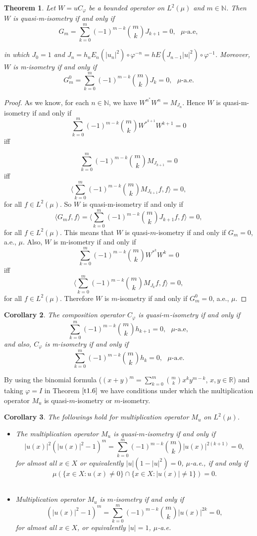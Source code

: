 \documentclass{amsart}
\newtheorem{thm}{Theorem}[section]
\newtheorem{cor}[thm]{Corollary}
\theoremstyle{definition}\newtheorem{defn}[thm]{Definition}
\theoremstyle{remark}
\numberwithin{equation}{section}
\begin{document}
\begin{thm}\label{t1.6}
Let $W=uC_{\varphi}$ be a bounded operator on $L^2(\mu)$ and $m\in \mathbb{N}$. Then $W$ is quasi-m-isometry if and only if
$$G_m=\sum_{k=0}^{m}(-1)^{m-k}\binom{m}{k}J_{k+1}=0,\ \ \ \text{$\mu$-a.e},$$

in which $J_0=1$ and $J_n=h_nE_n(|u_n|^2)\circ\varphi^{-n}=hE(J_{n-1}|u|^2)\circ\varphi^{-1}$.
Moreover, $W$ is m-isometry if and only if 
$$G^0_m=\sum_{k=0}^{m}(-1)^{m-k}\binom{m}{k}J_{k}=0, \ \ \ \text{$\mu$-a.e}.$$
\end{thm}
\begin{proof}
As we know, for each $n\in \mathbb{N}$, we have $W^{n^*}W^n=M_{J_n}$. Hence $W$ is quasi-m-isometry if and only if
$$\sum_{k=0}^{m}(-1)^{m-k}\binom{m}{k}W^{*^{k+1}}W^{k+1}=0$$
iff

$$\sum_{k=0}^{m}(-1)^{m-k}\binom{m}{k}M_{J_{k+1}}=0$$
iff
$$\langle \sum_{k=0}^{m}(-1)^{m-k}\binom{m}{k}M_{J_{k+1}}f,f\rangle=0,$$
 for all $f\in L^2(\mu)$.
So $W$ is quasi-m-isometry if and only if
$$\langle G_mf,f\rangle=\langle \sum_{k=0}^{m}(-1)^{m-k}\binom{m}{k}J_{k+1}f,f\rangle=0,$$
 for all $f\in L^2(\mu)$. This means that $W$ is quasi-$m$-isometry if and only if $G_m=0$, a.e., $\mu$. Also,  $W$ is m-isometry if and only if
$$\sum_{k=0}^{m}(-1)^{m-k}\binom{m}{k}W^{*^{k}}W^{k}=0$$
iff
$$\langle \sum_{k=0}^{m}(-1)^{m-k}\binom{m}{k}M_{J_{k}}f,f\rangle=0,$$
 for all $f\in L^2(\mu)$. Therefore $W$ is $m$-isometry if and only if $G^0_m=0$, a.e., $\mu$.
\end{proof}
\begin{cor}
The composition operator $C_{\varphi}$ is quasi-$m$-isometry if and only if 
$$\sum_{k=0}^{m}(-1)^{m-k}\binom{m}{k}h_{k+1}=0, \ \ \ \text{$\mu$-a.e},$$
and also, $C_{\varphi}$ is m-isometry if and only if
 $$\sum_{k=0}^{m}(-1)^{m-k}\binom{m}{k}h_{k}=0, \ \ \ \text{$\mu$-a.e}.$$
\end{cor}
By using the binomial formula ($(x+y)^m=\sum_{k=0}^{m}\binom{m}{k}x^ky^{m-k}$,  $x,y\in \mathbb{R}$) and taking $\varphi=I$ in Theorem $\ref{t1.6}$ we have conditions under which the multiplication operator $M_u$ is quasi-$m$-isometry or $m$-isometry. 
\begin{cor}
The followings hold for multiplication operator $M_u$ on $L^2(\mu)$.
\begin{itemize}
 \item  
The multiplication operator $M_u$ is quasi-$m$-isometry if and only if 
$$|u(x)|^2(|u(x)|^2-1)^m=\sum_{k=0}^{m}(-1)^{m-k}\binom{m}{k}|u(x)|^{2(k+1)}=0,$$
for almost all $x\in X$ or equivalently $|u|(1-|u|^2)=0$, $\mu$-a.e., if and only if 
  $$\mu(\{x\in X:u(x)\neq 0\}\cap\{x\in X:|u(x)|\neq 1\})=0.$$\\

\item Multiplication operator $M_u$ is $m$-isometry if and only if
 $$(|u(x)|^2-1)^m=\sum_{k=0}^{m}(-1)^{m-k}\binom{m}{k}|u(x)|^{2k}=0,$$ 
 for almost all $x\in X$, or equivalently $|u|=1$, $\mu$-a.e.\\
 \end{itemize}
\end{cor}
\end{document}

